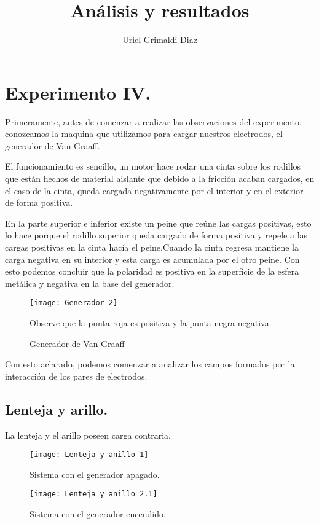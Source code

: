 \documentclass[spanish,10pt,a4paper,final,onecolumn,leqno,fleqn]{article}
\title{Análisis y resultados}
\author{Uriel Grimaldi Diaz }
\begin{document}
\maketitle
\section{Experimento IV.}

Primeramente, antes de comenzar a realizar las observaciones del experimento, conozcamos la maquina que utilizamos para cargar nuestros electrodos, el generador de Van Graaff.

El funcionamiento es sencillo, un motor hace rodar una cinta sobre los rodillos que están hechos de material aislante que debido a la fricción acaban cargados, en el caso de la cinta, queda cargada negativamente por el interior y en el exterior de forma positiva.

En la parte superior e inferior existe un peine que reúne las cargas positivas, esto lo hace porque el rodillo superior queda cargado de forma positiva y repele a las cargas positivas en la cinta hacía el peine.Cuando la cinta regresa mantiene la carga negativa en su interior y esta carga es acumulada por el otro peine. Con esto podemos concluir que la polaridad es positiva en la superficie de la esfera metálica y negativa en la base del generador.

\begin{figure}[h!]
	\centering
	\texttt{[image: Generador 2]}
	\caption{Generador de Van Graaff}
	\label{fig:Generador}
	Observe que la punta roja es positiva y la punta negra negativa.
\end{figure}

Con esto aclarado, podemos comenzar a analizar los campos formados por la interacción de los pares de electrodos.

\newpage
\subsection{Lenteja y arillo.}



La lenteja y el arillo poseen carga contraria.

\begin{figure}[h!]
	\centering
	\texttt{[image: Lenteja y anillo 1]}
	\caption{Sistema con el generador apagado.}
	\label{fig:AyLO}
\end{figure}


\begin{figure}[h!]
	\centering
	\texttt{[image: Lenteja y anillo 2.1]}
	\caption{Sistema con el generador encendido.}
	\label{fig:AyLE1}
\end{figure}
\end{document}
